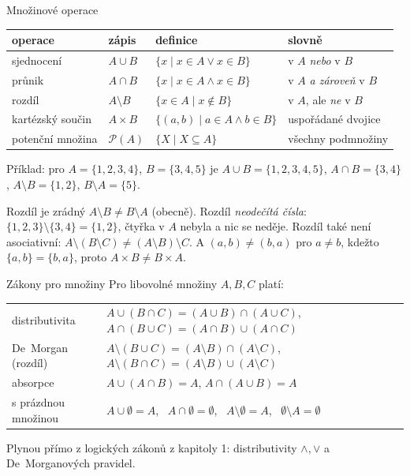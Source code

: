 \documentclass[10pt,a4paper]{article}
\newcommand{\sm}{\setminus}
\begin{document}
\begin{defin}{Množinové operace}
\begin{center}
\small
\begin{tabular}{@{}llll@{}}
\toprule
\textbf{operace} & \textbf{zápis} & \textbf{definice} & \textbf{slovně}\\\midrule
sjednocení & $A\cup B$ & $\{x\mid x\in A\lor x\in B\}$ & v $A$ \emph{nebo} v $B$\\
průnik & $A\cap B$ & $\{x\mid x\in A\land x\in B\}$ & v $A$ \emph{a zároveň} v $B$\\
rozdíl & $A\sm B$ & $\{x\in A\mid x\notin B\}$ & v $A$, ale \emph{ne} v $B$\\
kartézský součin & $A\times B$ & $\{(a,b)\mid a\in A\land b\in B\}$ & uspořádané dvojice\\
potenční množina & $\mathcal P(A)$ & $\{X\mid X\subseteq A\}$ & všechny podmnožiny\\\bottomrule
\end{tabular}
\end{center}
\end{defin}

Příklad: pro $A=\{1,2,3,4\}$, $B=\{3,4,5\}$ je $A\cup B=\{1,2,3,4,5\}$, $A\cap B=\{3,4\}$, $A\sm B=\{1,2\}$, $B\sm A=\{5\}$.

\begin{past}{Rozdíl je zrádný}
$A\sm B\neq B\sm A$ (obecně). Rozdíl \emph{neodečítá čísla}: $\{1,2,3\}\sm\{3,4\}=\{1,2\}$, čtyřka v $A$ nebyla a nic se neděje. Rozdíl také není asociativní: $A\sm(B\sm C)\neq(A\sm B)\sm C$. A $(a,b)\neq(b,a)$ pro $a\neq b$, kdežto $\{a,b\}=\{b,a\}$, proto $A\times B\neq B\times A$.
\end{past}

\begin{tvrz}{Zákony pro množiny}
Pro libovolné množiny $A,B,C$ platí:
\begin{center}
\small
\begin{tabular}{@{}ll@{}}
distributivita & $A\cup(B\cap C)=(A\cup B)\cap(A\cup C)$, \quad $A\cap(B\cup C)=(A\cap B)\cup(A\cap C)$\\
De~Morgan (rozdíl) & $A\sm(B\cup C)=(A\sm B)\cap(A\sm C)$, \quad $A\sm(B\cap C)=(A\sm B)\cup(A\sm C)$\\
absorpce & $A\cup(A\cap B)=A$, \quad $A\cap(A\cup B)=A$\\
s prázdnou množinou & $A\cup\emptyset=A$, \ $A\cap\emptyset=\emptyset$, \ $A\sm\emptyset=A$, \ $\emptyset\sm A=\emptyset$
\end{tabular}
\end{center}
Plynou přímo z logických zákonů z kapitoly 1: distributivity $\land,\lor$ a De~Morganových pravidel.
\end{tvrz}
\end{document}
